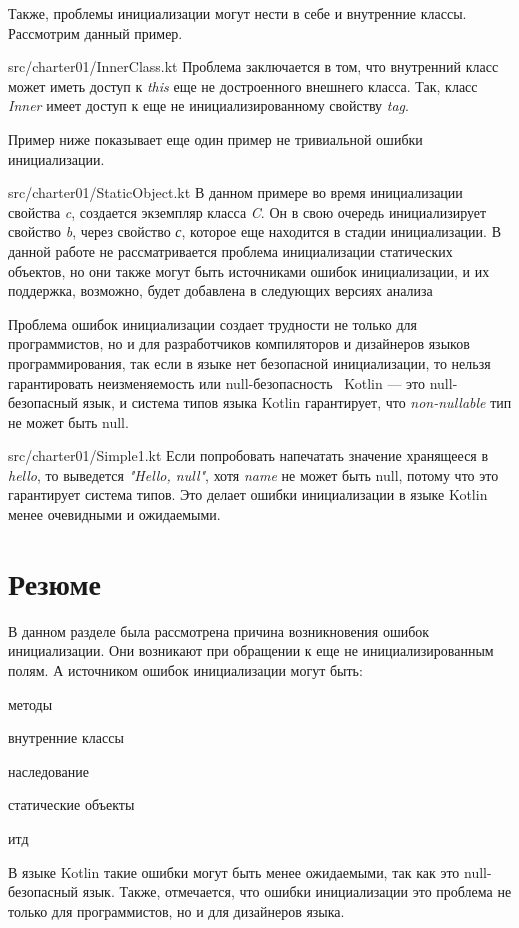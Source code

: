 Также, проблемы инициализации могут нести в себе и внутренние классы.
Рассмотрим данный пример.

{src/charter01/InnerClass.kt}
Проблема заключается в том, что внутренний класс может иметь доступ к \emph{this} еще не достроенного внешнего класса.
Так, класс \emph{Inner} имеет доступ к еще не инициализированному свойству \emph{tag}.

Пример ниже показывает еще один пример не тривиальной ошибки инициализации.

{src/charter01/StaticObject.kt}
В данном примере во время инициализации свойства \emph{c}, создается экземпляр класса \emph{C}.
Он в свою очередь инициализирует свойство \emph{b}, через свойство \emph{с}, которое еще находится в стадии инициализации.
В данной работе не рассматривается проблема инициализации статических объектов,
но они также могут быть источниками ошибок инициализации, и их поддержка, возможно,
будет добавлена в следующих версиях анализа

Проблема ошибок инициализации создает трудности не только для программистов,
но и для разработчиков компиляторов и дизайнеров языков программирования,
так если в языке нет безопасной инициализации, то нельзя гарантировать неизменяемость или null-безопасность~\cite{joe-duffy}
Kotlin --- это null-безопасный язык, и система типов языка Kotlin гарантирует, что \emph{non-nullable} тип не может быть null.

{src/charter01/Simple1.kt}
Если попробовать напечатать значение хранящееся в \emph{hello}, то выведется \emph{"Hello, null"},
хотя \emph{name} не может быть null, потому что это гарантирует система типов.
Это делает ошибки инициализации в языке Kotlin менее очевидными и ожидаемыми.

\section{Резюме}\label{sec:проблема-резюме}

В данном разделе была рассмотрена причина возникновения ошибок инициализации.
Они возникают при обращении к еще не инициализированным полям.
А источником ошибок инициализации могут быть:
\begin{itemize*}
    \item методы
    \item внутренние классы
    \item наследование
    \item статические объекты
    \item итд
\end{itemize*}
В языке Kotlin такие ошибки могут быть менее ожидаемыми, так как это null-безопасный язык.
Также, отмечается, что ошибки инициализации это проблема не только для программистов, но и для дизайнеров языка.